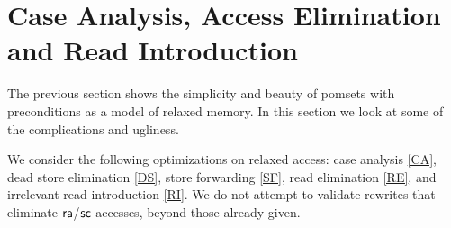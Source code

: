 \section{Case Analysis, Access Elimination and Read Introduction}
\label{sec:refine}

The previous section shows the simplicity and beauty of pomsets with
preconditions as a model of relaxed memory.  In this section we look at some
of the complications and ugliness.  

We consider the following optimizations on relaxed access: case analysis
\eqref{CA}, dead store elimination \eqref{DS}, store forwarding \eqref{SF},
read elimination \eqref{RE}, and irrelevant read introduction \eqref{RI}.  We
do not attempt to validate rewrites that eliminate ${\mathsf{ra}}$/${\mathsf{sc}}$
accesses, beyond those already given.


